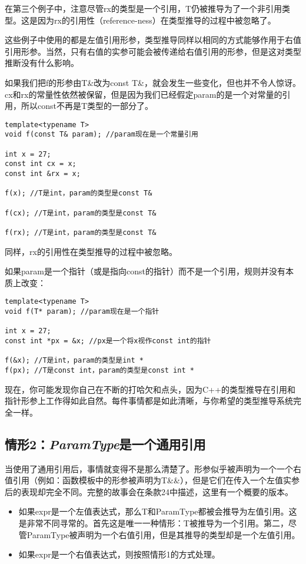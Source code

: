 在第三个例子中，注意尽管rx的类型是一个引用，T仍被推导为了一个非引用类型。这是因为rx的引用性（reference-ness）在类型推导的过程中被忽略了。

这些例子中使用的都是左值引用形参，类型推导同样以相同的方式能够作用于右值引用形参。当然，只有右值的实参可能会被传递给右值引用的形参，但是这对类型推断没有什么影响。

如果我们把f的形参由T\&改为const T\&，就会发生一些变化，但也并不令人惊讶。cx和rx的常量性依然被保留，但是因为我们已经假定param的是一个对常量的引用，所以const不再是T类型的一部分了。
\begin{lstlisting}
template<typename T>
void f(const T& param); //param现在是一个常量引用

int x = 27;
const int cx = x;
const int &rx = x;

f(x); //T是int，param的类型是const T&

f(cx); //T是int，param的类型是const T&

f(rx); //T是int，param的类型是const T&
\end{lstlisting}
同样，rx的引用性在类型推导的过程中被忽略。

如果param是一个指针（或是指向const的指针）而不是一个引用，规则并没有本质上改变：

\begin{lstlisting}
template<typename T>
void f(T* param); //param现在是一个指针

int x = 27;
const int *px = &x; //px是一个将x视作const int的指针

f(&x); //T是int，param的类型是int *
f(px); //T是const int，param的类型是const int *
\end{lstlisting}
现在，你可能发现你自己在不断的打哈欠和点头，因为C++的类型推导在引用和指针形参上工作得如此自然。每件事情都是如此清晰，与你希望的类型推导系统完全一样。

\subsection*{情形2：\textit{ParamType}是一个通用引用}
当使用了通用引用后，事情就变得不是那么清楚了。形参似乎被声明为一个一个右值引用（例如：函数模板中的形参被声明为T\&\&），但是它们在传入一个左值实参后的表现却完全不同。完整的故事会在条款24中描述，这里有一个概要的版本。

\begin{itemize}
\item{如果expr是一个左值表达式，那么T和ParamType都被会推导为左值引用。这是非常不同寻常的。首先这是唯一一种情形：T被推导为一个引用。第二，尽管ParamType被声明为一个右值引用，但是其推导的类型却是一个左值引用。}
\item{如果expr是一个右值表达式，则按照情形1的方式处理。}
\end{itemize}


